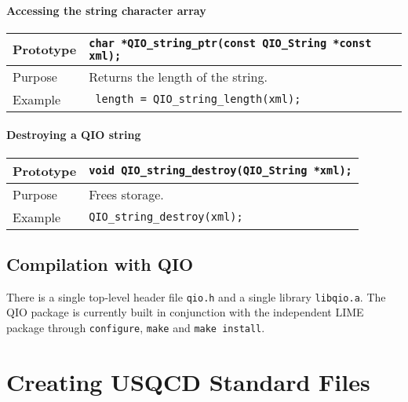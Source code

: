 \documentclass{article}
\newcommand{\QIOstring}{{\tt QIO\_String }}
\begin{document}
\paragraph{Accessing the string character array}

\begin{flushleft}
  \begin{tabular}{|l|l|}
  \hline
  Prototype      & \verb|char *QIO_string_ptr(const |\QIOstring \verb|*const xml);|\\
    \hline
  Purpose        & Returns the length of the string. \\
   \hline
  Example        & \verb| length = QIO_string_length(xml);| \\
   \hline
 \end{tabular}
\end{flushleft}
%
\paragraph{Destroying a QIO string}

\begin{flushleft}
  \begin{tabular}{|l|l|}
  \hline
  Prototype      & \verb|void QIO_string_destroy(|\QIOstring \verb|*xml);|\\
    \hline
  Purpose        & Frees storage. \\
   \hline
  Example        & \verb|QIO_string_destroy(xml);| \\
   \hline
 \end{tabular}
\end{flushleft}
%

\subsection{Compilation with QIO}

There is a single top-level header file \verb|qio.h| and a single
library \verb|libqio.a|.  The QIO package is currently built in
conjunction with the independent LIME package through
\verb|configure|, \verb|make| and \verb|make install|.

\appendix

\section{Creating USQCD Standard Files}
\end{document}
